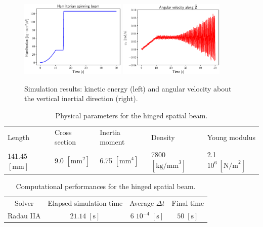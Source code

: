 \documentclass{svjour3}                     %
\newcommand{\secondRev}[1]{\textcolor{blue!80!black}{#1}}
\begin{document}
	\begin{figure}[tb]
		\centering
		\includegraphics[width=0.45\textwidth]{H_3Dbeam.eps} 
		\includegraphics[width=0.45\textwidth]{omega_zI.eps} 
		\caption{Simulation results: kinetic energy (left) and angular velocity about the vertical inertial direction (right).}
		\label{fig:H_omega}
	\end{figure}
	
	\begin{table}[tb]
		\caption{Physical parameters for the hinged spatial beam.}
		\label{tab:data_3Dbeam}       %
		\begin{tabular}{lllll}
			\hline\noalign{\smallskip}
			Length & Cross section & Inertia moment & Density & Young modulus \\
			\noalign{\smallskip}\hline\noalign{\smallskip}
			141.45 $[\mathrm{mm}]$ & 9.0 $[\mathrm{mm}^2]$ & 6.75 $[\mathrm{mm}^4]$ & 7800 $[\mathrm{kg/mm}^3]$ & 2.1 $10^6 \ [\mathrm{N/m}^2]$  \\
			\hline
		\end{tabular}
	\end{table}
	
	
	\begin{table}[tb]
		\centering
		\caption{\secondRev{Computational performances for the hinged spatial beam.}}
		\label{tab:comp_perf_hinged}       %
		\begin{tabular}{cccc}
			\hline\noalign{\smallskip}
			Solver & Elapsed simulation time & Average $\Delta t$ &  Final time \\
			\noalign{\smallskip}\hline\noalign{\smallskip}
			Radau IIA & $21.14\; \mathrm{[s]}$ & $6 \; 10^{-4} \; \mathrm{[s]}$ & $50 \; \mathrm{[s]}$ \\
			\hline
		\end{tabular}
	\end{table}
	
\end{document}
